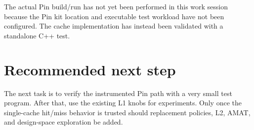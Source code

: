 \documentclass[11pt]{article}
\begin{document}
The actual Pin build/run has not yet been performed in this work session because
the Pin kit location and executable test workload have not been configured.
The cache implementation has instead been validated with a standalone C++
test.

\section{Recommended next step}

The next task is to verify the instrumented Pin path with a very small test
program. After that, use the existing L1 knobs for experiments. Only once the
single-cache hit/miss behavior is trusted should replacement policies, L2, AMAT,
and design-space exploration be added.
\end{document}
